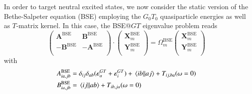 \documentclass[aip,jcp,reprint,noshowkeys,superscriptaddress]{revtex4-1}
\newcommand{\BSE}{\text{BSE}}
\newcommand{\GT}{GT}
\newcommand{\e}[2]{\eps_{#1}^{#2}}
\newcommand{\Om}[2]{\Omega_{#1}^{#2}}
\newcommand{\bA}[2]{\mathbf{A}_{#1}^{#2}}
\newcommand{\bB}[2]{\mathbf{B}_{#1}^{#2}}
\newcommand{\bX}[2]{\mathbf{X}_{#1}^{#2}}
\newcommand{\bY}[2]{\mathbf{Y}_{#1}^{#2}}
\newcommand{\eps}{\varepsilon}
\begin{document}
In order to target neutral excited states, we now consider the static version of the Bethe-Salpeter equation (BSE) employing the $G_0T_0$ quasiparticle energies as well as $T$-matrix kernel.
In this case, the BSE@$GT$ eigenvalue problem reads
\begin{equation}
\label{eq:LR-RPA}
	\begin{pmatrix}
		\bA{}{\BSE}		&	\bB{}{\BSE}	\\
		-\bB{}{\BSE}	&	-\bA{}{\BSE}	\\
	\end{pmatrix}
	\cdot
	\begin{pmatrix}
		\bX{m}{\BSE}	\\
		\bY{m}{\BSE}	\\
	\end{pmatrix}
	=
	\Om{m}{\BSE}
	\begin{pmatrix}
		\bX{m}{\BSE}	\\
		\bY{m}{\BSE}	\\
	\end{pmatrix}
\end{equation}
with 
\begin{subequations}
\begin{align}
	A_{ia,jb}^{\BSE} & = \delta_{ij} \delta_{ab} (\e{a}{\GT} + \e{i}{\GT}) + \mel{ib}{}{aj} + T_{ij,ba}(\omega=0)
	\\ 
	B_{ia,jb}^{\BSE} & = \mel{ij}{}{ab} + T_{ib,ja}(\omega=0)
\end{align}
\end{subequations}
\end{document}
